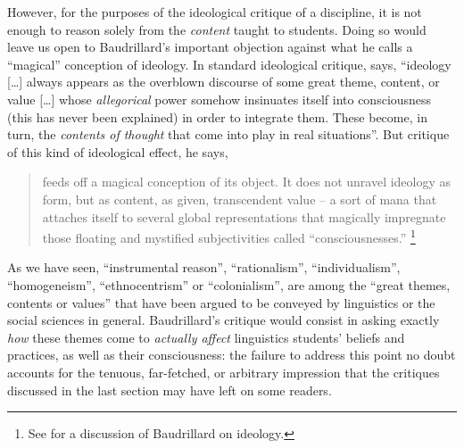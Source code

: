 \documentclass[output=paper]{langscibook}
\begin{document}
However, for the purposes of the ideological critique of a discipline, it is not enough to reason solely from the \emph{content} taught to students. Doing so would leave us open to Baudrillard's important objection against what he calls a ``magical'' conception of ideology. In standard ideological critique, \citet[79, italics original]{Baudrillard19881972} says, ``ideology […] always appears as the overblown discourse of some great theme, content, or value […] whose \emph{allegorical} power somehow insinuates itself into consciousness (this has never been explained) in order to integrate them. These become, in turn, the \emph{contents of thought} that come into play in real situations''. But critique of this kind of ideological effect, he says,

\begin{quotation}
feeds off a magical conception of its object. It does not unravel ideology as form, but as content, as given, transcendent value -- a sort of mana that attaches itself to several global representations that magically impregnate those floating and mystified subjectivities called ``consciousnesses.'' \citep[79]{Baudrillard19881972}\footnote{See \citet{Larrain1994} for a discussion of Baudrillard on ideology.} 
\end{quotation}

\noindent As we have seen, ``instrumental reason'', ``rationalism'', ``individualism'', ``homogeneism'', ``ethnocentrism'' or ``colonialism'', are among the ``great themes, contents or values'' that have been argued to be conveyed by linguistics or the social sciences in general. Baudrillard's critique would consist in asking exactly \emph{how} these themes come to \emph{actually affect} linguistics students' beliefs and practices, as well as their consciousness: the failure to address this point no doubt accounts for the tenuous, far-fetched, or arbitrary impression that the critiques discussed in the last section may have left on some readers. 
\end{document}
